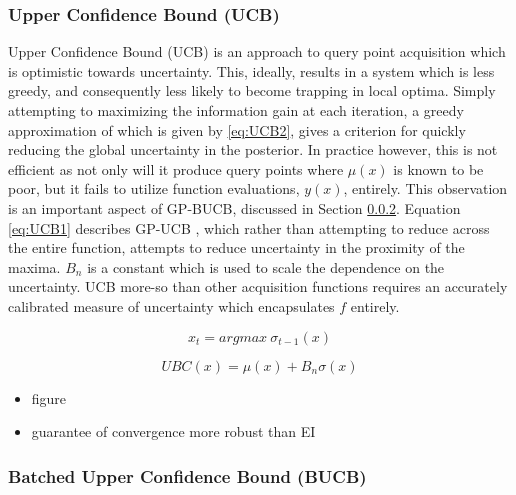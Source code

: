 \documentclass{article}
\begin{document}
		\subsubsection{Upper Confidence Bound (UCB)}
			Upper Confidence Bound (UCB) is an approach to query point acquisition which is optimistic towards uncertainty. This, ideally, results in a system which is less greedy, and consequently less likely to become trapping in local optima. Simply attempting to maximizing the information gain at each iteration, a greedy approximation of which is given by \ref{eq:UCB2}, gives a criterion for quickly reducing the global uncertainty in the posterior. In practice however, this is not efficient as not only will it produce query points where \(\mu(x)\) is known to be poor, but it fails to utilize function evaluations, \(y(x)\), entirely. This observation is an important aspect of GP-BUCB, discussed in Section \ref{BUCB}. Equation \ref{eq:UCB1} describes GP-UCB \cite{GP-UCB}, which rather than attempting to reduce across the entire function, attempts to reduce uncertainty in the proximity of the maxima. \(B_n\) is a constant which is used to scale the dependence on the uncertainty. UCB more-so than other acquisition functions requires an accurately calibrated measure of uncertainty which encapsulates \(f\) entirely.



			\begin{equation}\label{eq:UCB2} x_t = argmax ~\sigma_{t-1}(x) \end{equation}


			\begin{equation}\label{eq:UCB1} UBC(x) = \mu(x) + B_n\sigma(x) \end{equation}

			\begin{itemize}

				\item figure

				\item guarantee of convergence more robust than EI

			\end{itemize}


		\subsubsection{Batched Upper Confidence Bound (BUCB)}\label{BUCB}
\end{document}
